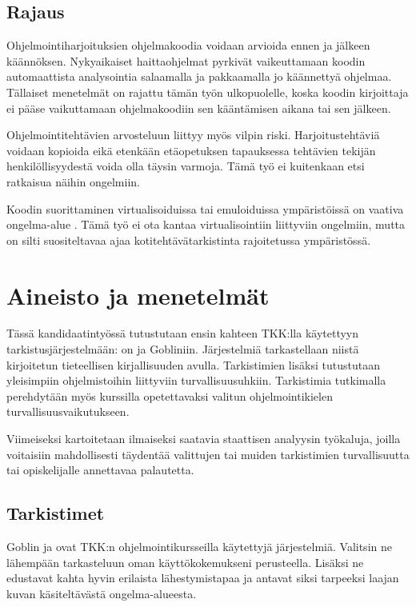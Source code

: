 \subsection{Rajaus}

Ohjelmointiharjoituksien ohjelmakoodia voidaan arvioida ennen ja jälkeen
käännöksen. Nykyaikaiset haittaohjelmat pyrkivät vaikeuttamaan koodin
automaattista analysointia salaamalla ja pakkaamalla jo käännettyä ohjelmaa.
Tällaiset menetelmät on rajattu tämän työn ulkopuolelle, koska koodin
kirjoittaja ei pääse vaikuttamaan ohjelmakoodiin sen kääntämisen aikana tai sen
jälkeen.

Ohjelmointitehtävien arvosteluun liittyy myös vilpin riski. Harjoitustehtäviä
voidaan kopioida eikä etenkään etäopetuksen tapauksessa tehtävien tekijän
henkilöllisyydestä voida olla täysin varmoja. \citep{carter2003shall} Tämä työ
ei kuitenkaan etsi ratkaisua näihin ongelmiin. 

Koodin suorittaminen virtualisoiduissa tai emuloiduissa ympäristöissä on
vaativa ongelma-alue \citep{kesti2010}. Tämä työ ei ota kantaa virtualisointiin
liittyviin ongelmiin, mutta on silti suositeltavaa ajaa kotitehtävätarkistinta
rajoitetussa ympäristössä.


\section{Aineisto ja menetelmät}
\label{sec:aineisto}

Tässä kandidaatintyössä tutustutaan ensin kahteen TKK:lla käytettyyn
tarkistusjärjestelmään: {\scmrobo}on ja Gobliniin. Järjestelmiä tarkastellaan
niistä kirjoitetun tieteellisen kirjallisuuden avulla. Tarkistimien lisäksi
tutustutaan yleisimpiin ohjelmistoihin liittyviin turvallisuusuhkiin.
Tarkistimia tutkimalla perehdytään myös kurssilla opetettavaksi valitun
ohjelmointikielen turvallisuusvaikutukseen.

Viimeiseksi kartoitetaan ilmaiseksi saatavia staattisen
analyysin työkaluja, joilla voitaisiin mahdollisesti täydentää valittujen tai
muiden tarkistimien turvallisuutta tai opiskelijalle annettavaa palautetta.

\subsection{Tarkistimet}

Goblin ja {\scmrobo} ovat TKK:n ohjelmointikursseilla käytettyjä järjestelmiä.
Valitsin ne lähempään tarkasteluun oman käyttökokemukseni
perusteella. Lisäksi ne edustavat kahta hyvin erilaista lähestymistapaa ja
antavat siksi tarpeeksi laajan kuvan käsiteltävästä ongelma-alueesta.

